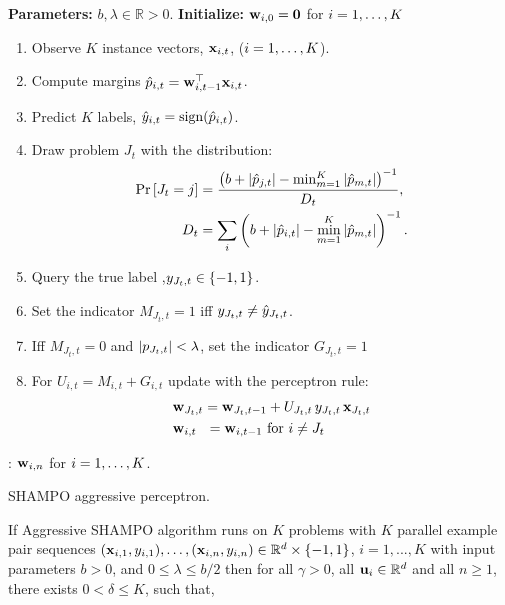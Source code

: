 {\begin{algorithm}[h]
\begin{algorithmic}
   \State \textbf{Parameters:}  $b, \lambda \in\mathbb{R}>0$.
   \State \textbf{Initialize:}  $\mathbf{w}_{i,0}={\boldsymbol{0}}$ for $i=1, \ldots , K$ \\
\begin{enumerate}
\nolineskips
\item Observe $K$ instance vectors, $\mathbf{x}_{i,t}$, ($i=1 , \ldots , K$).
\item Compute margins $\hat{p}_{i,t}={\mathbf{w}}^{\top}_{i,t-1} \mathbf{x}_{i,t}$.
\item Predict $K$ labels, $\hat{y}_{i,t}={\rm sign}(\hat{p}_{i,t})$.
\item Draw problem $J_t$  with the distribution:
\begin{align}
{\rm Pr}\left[{J_t=j}\right] &=
\frac{\left({b+\left\vert{\hat{p}_{j,t}}\right\vert-\min_{m=1}^K\left\vert{\hat{p}_{m,t}}\right\vert}\right)^{-1}}{D_{t}}, ~\nonumber\\
D_t &=
\sum_i \left({b+\left\vert{\hat{p}_{i,t}}\right\vert-\min_{m=1}^K\left\vert{\hat{p}_{m,t}}\right\vert}\right)^{-1}. \nonumber
\end{align}
\item Query the true label ,$y_{J_t,t}\in\{-1,1\}$.
\item Set the indicator $M_{J_t, t}=1$ iff $y_{J_t,t} \neq \hat{y}_{J_t,t}$.
\item Iff $M_{J_t, t}=0$ and $\left\vert{p_{J_t,t}}\right\vert<\lambda$, set  the indicator $G_{J_t,t}=1$
\item For $U_{i,t}=M_{i,t}+G_{i,t}$ update with the perceptron rule:
\begin{align}
&\mathbf{w}_{J_t,t} = \mathbf{w}_{J_t,t-1}+U_{J_t,t} \, y_{J_t,t}\, \mathbf{x}_{J_t,t}  \nonumber\\
&\mathbf{w}_{i,t} ~~= \mathbf{w}_{i,t-1}  \textrm{ for } i \neq J_t \nonumber
\end{align}
\end{enumerate}
   \EndFor  
   : $\mathbf{w}_{i,n}$ for $i=1 , \ldots , K$.
\end{algorithmic}
\caption{SHAMPO aggressive perceptron.}
\label{alg:SHAMPO_FO_aggressive}
\end{algorithm}    


  


\begin{theorem}
  If Aggressive SHAMPO algorithm runs on $K$ problems with $K$ parallel example pair
  sequences
  $(\mathbf{x}_{i,1},y_{i,1}),\ldots,(\mathbf{x}_{i,n},y_{i,n})\in\mathbb{R}^d\times\{-1,1\}$,
  $i=1,...,K$ with input parameters $b>0$, and $0 \le \lambda \le b/2$ then for all $\gamma>0$, all
  $\mathbf{u}_{i}\in\mathbb{R}^d$ and all $n\ge1$, there exists $0<\delta\le K$, such that,
  

\end{theorem}}

